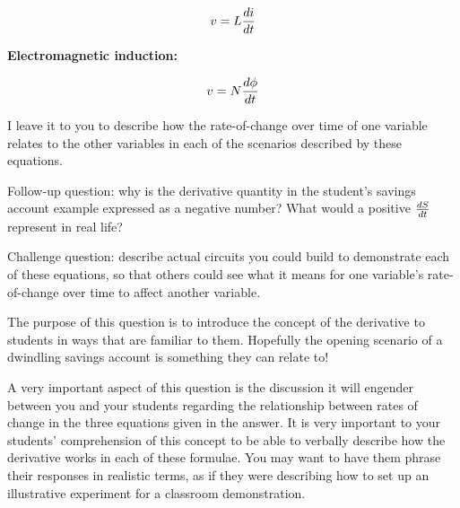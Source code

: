 $$v = L {di \over dt}$$

\vskip 20pt

\noindent
{\bf Electromagnetic induction:}

$$v = N {d \phi \over dt}$$

\vskip 20pt

I leave it to you to describe how the rate-of-change over time of one variable relates to the other variables in each of the scenarios described by these equations.

\vskip 10pt

Follow-up question: why is the derivative quantity in the student's savings account example expressed as a negative number?  What would a positive $dS \over dt$ represent in real life?

\vskip 10pt

Challenge question: describe actual circuits you could build to demonstrate each of these equations, so that others could see what it means for one variable's rate-of-change over time to affect another variable.







The purpose of this question is to introduce the concept of the derivative to students in ways that are familiar to them.  Hopefully the opening scenario of a dwindling savings account is something they can relate to!

A very important aspect of this question is the discussion it will engender between you and your students regarding the relationship between rates of change in the three equations given in the answer.  It is very important to your students' comprehension of this concept to be able to verbally describe how the derivative works in each of these formulae.  You may want to have them phrase their responses in realistic terms, as if they were describing how to set up an illustrative experiment for a classroom demonstration.




